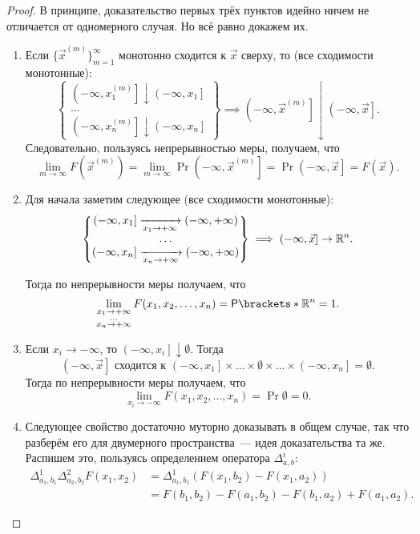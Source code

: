 \begin{proof}
	В принципе, доказательство первых трёх пунктов идейно ничем не отличается от одномерного случая. Но всё равно докажем их.
	\begin{enumerate}
		\item Если \(\{\vec{x}^{(m)}\}_{m = 1}^{\infty}\) монотонно сходится к \(\vec{x}\) сверху, то (все сходимости монотонные):
		\[
		\left\{\begin{matrix}
		\left(-\infty, x_1^{(m)}\right] \downarrow \left(-\infty, x_1\right] \\
		\dots \\
		\left(-\infty, x_n^{(m)}\right] \downarrow \left(-\infty, x_n\right]
		\end{matrix}\right\}
		\implies
		\left(-\infty, \vec{x}^{(m)}\right] \downarrow \left(-\infty, \vec{x}\right].
		\]
		Следовательно, пользуясь непрерывностью меры, получаем, что	
		\[
		\lim\limits_{m \to \infty} F(\vec{x}^{(m)}) = \lim\limits_{m \to \infty} \Pr{\left(-\infty, \vec{x}^{(m)}\right]} = \Pr{\left(-\infty, \vec{x}\right]} = F(\vec{x}).
		\]
		
		\item Для начала заметим следующее (все сходимости монотонные):
		\[
		\left\{\begin{matrix}
		\left(-\infty, x_1\right] \xrightarrow[x_1 \to +\infty]{} \left(-\infty, +\infty\right) \\
		\dots \\
		\left(-\infty, x_n\right] \xrightarrow[x_n \to +\infty]{} \left(-\infty, +\infty\right)
		\end{matrix}\right\}
		\implies
		\left(-\infty, \vec{x}\right] \to \mathbb{R}^{n}.
		\]
		
		Тогда по непрерывности меры получаем, что
		\[
		\lim\limits_{\substack{x_1 \to +\infty \\ \dots \\ x_n \to +\infty}} F(x_1, x_2, \dots, x_n) = \Pr{\R^{n}} = 1.
		\]
		
		\item Если \(x_{i} \to -\infty\), то \(\left(-\infty, x_i\right] \downarrow \emptyset\). Тогда 
		\[
		\left(-\infty, \vec{x}\right] \text{ сходится к } \left(-\infty, x_1\right] \times \dots \times \emptyset \times \dots \times \left(-\infty, x_n\right] = \emptyset.
		\]
		Тогда по непрерывности меры получаем, что
		\[
		\lim\limits_{x_i \to -\infty} F(x_1, x_2, \dots, x_n) = \Pr{\emptyset} = 0.
		\]
		
		\item Следующее свойство достаточно муторно доказывать в общем случае, так что разберём его для двумерного пространства~--- идея доказательства та же. Распишем это, пользуясь определением оператора \(\Delta_{a, b}^{i}\):
		\begin{align}
			\Delta_{a_1, b_1}^{1} \Delta_{a_2, b_2}^{2} F(x_1, x_2) &= \Delta_{a_1, b_1}^{1} \left(F(x_1, b_2) - F(x_1, a_2)\right) \\
			&= F(b_1, b_2) - F(a_1, b_2) - F(b_1, a_2) + F(a_1, a_2).
		\end{align}
		

\end{enumerate}
\end{proof}
